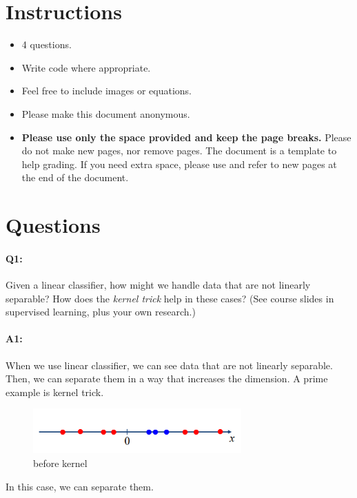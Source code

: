\maketitle
\vspace{-3cm}
\thispagestyle{fancy}

\section*{Instructions}
\begin{itemize}
  \item 4 questions.
  \item Write code where appropriate.
  \item Feel free to include images or equations.
  \item Please make this document anonymous.
  \item \textbf{Please use only the space provided and keep the page breaks.} Please do not make new pages, nor remove pages. The document is a template to help grading. If you need extra space, please use and refer to new pages at the end of the document.
\end{itemize}

\section*{Questions}

\paragraph{Q1:} Given a linear classifier, how might we handle data that are not linearly separable? How does the \emph{kernel trick} help in these cases? (See course slides in supervised learning, plus your own research.)

\paragraph{A1:} 
When we use linear classifier, we can see data that are not linearly separable. Then, we can separate them in a way that increases the dimension. A prime example is kernel trick.

\begin{figure}[!h]
    \centering
    \includegraphics[width=8cm]{q1_1.png}
    \caption{before kernel}
    \label{fig:Question1}
\end{figure}
In this case, we can separate them.

